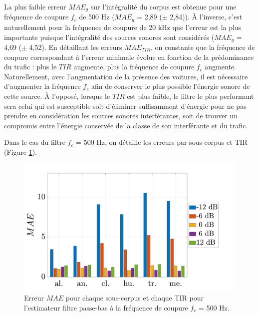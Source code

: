 La plus faible erreur $MAE_g$ sur l'intégralité du corpus est obtenue pour une fréquence de coupure $f_c$ de 500 Hz ($MAE_g$ = 2,89 ($\pm$ 2,84)).
\`A l'inverse, c'est naturellement pour la fréquence de coupure de 20 kHz que l'erreur est la plus importante puisque l'intégralité des sources sonores sont considérés ($MAE_g$ = 4,69 ($\pm$ 4,52). 
En détaillant les erreurs $MAE_{TIR}$, on constante que la fréquence de coupure correspondant à l'erreur minimale évolue en fonction de la prédominance du trafic : plus le $TIR$ augmente, plus la fréquence de coupure $f_c$ augmente.
Naturellement, avec l'augmentation de la présence des voitures, il est nécessaire d'augmenter la fréquence $f_c$ afin de conserver le plus possible l'énergie sonore de cette source. \`A l'opposé, lorsque le $TIR$ est plus faible, le filtre le plus performant sera celui qui est susceptible soit d'éliminer suffisamment d'énergie pour ne pas prendre en considération les sources sonores interférantes, soit de trouver un compromis entre l'énergie conservée de la classe de son interférante et du trafic.

Dans le cas du filtre $f_c$ = 500 Hz,  on détaille les erreurs par sous-corpus et TIR (Figure \ref{fig:filtre_amb_tir}). 

\begin{figure}[h]
\centering
\includegraphics[width=0.7\linewidth]{./figures/resultats/amb_filtre_500_bar.pdf}
\caption{Erreur $MAE$ pour chaque sous-corpus et chaque TIR pour l'estimateur filtre passe-bas à la fréquence de coupure $f_c$ = 500 Hz.}
\label{fig:filtre_amb_tir}
\end{figure}

